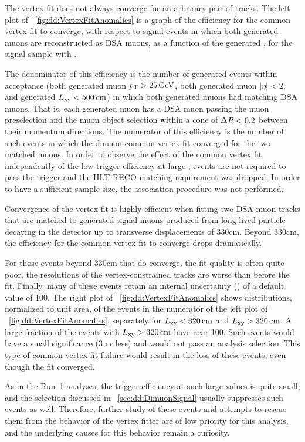 The vertex fit does not always converge for an arbitrary pair of tracks.
The left plot of \Fig~\ref{fig:dd:VertexFitAnomalies} is a graph of the efficiency for the common vertex fit to converge, with respect to signal events in which both generated muons are reconstructed as DSA muons, as a function of the generated \Lxy, for the \twoMu signal sample with .

The denominator of this efficiency is the number of generated events within acceptance (both generated muon $p_{\mathrm{T}} > 25\,\text{Ge\hspace{-.08em}V}$, both generated muon $|\eta| < 2$, and generated \mbox{$L_{\mathrm{xy}} < 500\,\text{cm}$}) in which both generated muons had matching DSA muons.
That is, each generated muon has a DSA muon passing the muon preselection and the muon object selection within a cone of $\Delta R < 0.2$ between their momentum directions.
The numerator of this efficiency is the number of such events in which the dimuon common vertex fit converged for the two matched muons.
In order to observe the effect of the common vertex fit independently of the low trigger efficiency at large \Lxy, events are not required to pass the trigger and the HLT-RECO matching requirement was dropped.
In order to have a sufficient sample size, the \DSAToPAT association procedure was not performed.

Convergence of the vertex fit is highly efficient when fitting two DSA muon tracks that are matched to generated signal muons produced from long-lived particle decaying in the detector up to transverse displacements of 330\unit{cm}.
Beyond 330\unit{cm}, the efficiency for the common vertex fit to converge drops dramatically.

For those events beyond 330\unit{cm} that do converge, the fit quality is often quite poor, \eg the \pT resolutions of the vertex-constrained tracks are worse than before the fit.
Finally, many of these events retain an internal \Lxy uncertainty (\LxyErr) of a default value of 100\cm.
The right plot of \Fig~\ref{fig:dd:VertexFitAnomalies} shows distributions, normalized to unit area, of the events in the numerator of the left plot of \Fig~\ref{fig:dd:VertexFitAnomalies}, separately for $L_{\mathrm{xy}} < 320\,\text{cm}$ and $L_{\mathrm{xy}} > 320\,\text{cm}$.
A large fraction of the events with $L_{\mathrm{xy}} > 320\,\text{cm}$ have \LxyErr near 100\cm.
Such events would have a small \Lxy significance (3 or less) and would not pass an analysis selection.
This type of common vertex fit failure would result in the loss of these events, even though the fit converged.

As in the Run~1 analyses, the trigger efficiency at such large \Lxy values is quite small, and the \LxySig selection discussed in \Sec~\ref{sec:dd:DimuonSignal} usually suppresses such events as well.
Therefore, further study of these events and attempts to rescue them from the behavior of the vertex fitter are of low priority for this analysis, and the underlying causes for this behavior remain a curiosity.

